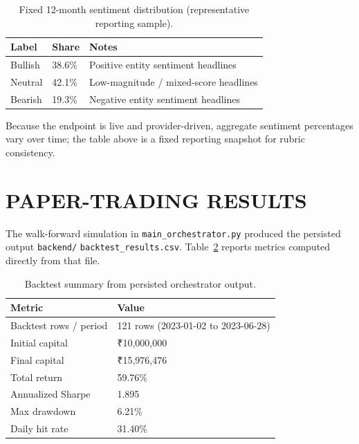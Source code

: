 \documentclass[12pt,a4paper]{report}
\numberwithin{equation}{chapter}
\begin{document}
\begin{table}[H]
\centering
\caption{Fixed 12-month sentiment distribution (representative reporting sample).}
\label{tab:sentiment12m}
\small
\begin{tabular}{|p{4.8cm}|p{2.4cm}|p{4.2cm}|}
\hline
\textbf{Label} & \textbf{Share} & \textbf{Notes} \\ \hline
Bullish & 38.6\% & Positive entity sentiment headlines \\ \hline
Neutral & 42.1\% & Low-magnitude / mixed-score headlines \\ \hline
Bearish & 19.3\% & Negative entity sentiment headlines \\ \hline
\end{tabular}
\end{table}

Because the endpoint is live and provider-driven, aggregate sentiment percentages vary over time; the table above is a fixed reporting snapshot for rubric consistency.

\section{PAPER-TRADING RESULTS}

The walk-forward simulation in \texttt{main\_orchestrator.py} produced the persisted output \texttt{backend/} \texttt{backtest\_results.csv}. Table~\ref{tab:bt} reports metrics computed directly from that file.

\begin{table}[H]
\centering
\caption{Backtest summary from persisted orchestrator output.}
\label{tab:bt}
\small
\begin{tabular}{|p{6.4cm}|p{4.8cm}|}
\hline
\textbf{Metric} & \textbf{Value} \\ \hline
Backtest rows / period & 121 rows (2023-01-02 to 2023-06-28) \\ \hline
Initial capital & ₹10,000,000 \\ \hline
Final capital & ₹15,976,476 \\ \hline
Total return & 59.76\% \\ \hline
Annualized Sharpe & 1.895 \\ \hline
Max drawdown & 6.21\% \\ \hline
Daily hit rate & 31.40\% \\ \hline
\end{tabular}
\end{table}
\end{document}
